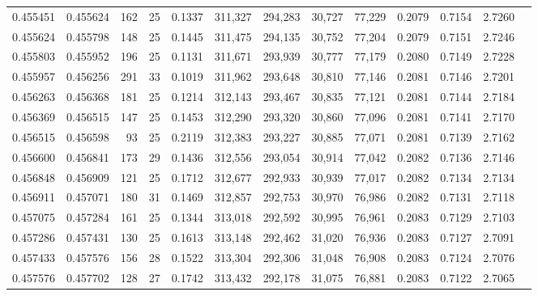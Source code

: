 \begin{tabular}{rrrrrrrrrrrrr}
0.455451 & 0.455624 &   162 &  25 &                                     0.1337 & 311,327 & 294,283 &  30,727 &  77,229 & 0.2079 & 0.7154 & 2.7260 \\
0.455624 & 0.455798 &   148 &  25 &                                     0.1445 & 311,475 & 294,135 &  30,752 &  77,204 & 0.2079 & 0.7151 & 2.7246 \\
0.455803 & 0.455952 &   196 &  25 &                                     0.1131 & 311,671 & 293,939 &  30,777 &  77,179 & 0.2080 & 0.7149 & 2.7228 \\
0.455957 & 0.456256 &   291 &  33 &                                     0.1019 & 311,962 & 293,648 &  30,810 &  77,146 & 0.2081 & 0.7146 & 2.7201 \\
0.456263 & 0.456368 &   181 &  25 &                                     0.1214 & 312,143 & 293,467 &  30,835 &  77,121 & 0.2081 & 0.7144 & 2.7184 \\
0.456369 & 0.456515 &   147 &  25 &                                     0.1453 & 312,290 & 293,320 &  30,860 &  77,096 & 0.2081 & 0.7141 & 2.7170 \\
0.456515 & 0.456598 &    93 &  25 &                                     0.2119 & 312,383 & 293,227 &  30,885 &  77,071 & 0.2081 & 0.7139 & 2.7162 \\
0.456600 & 0.456841 &   173 &  29 &                                     0.1436 & 312,556 & 293,054 &  30,914 &  77,042 & 0.2082 & 0.7136 & 2.7146 \\
0.456848 & 0.456909 &   121 &  25 &                                     0.1712 & 312,677 & 292,933 &  30,939 &  77,017 & 0.2082 & 0.7134 & 2.7134 \\
0.456911 & 0.457071 &   180 &  31 &                                     0.1469 & 312,857 & 292,753 &  30,970 &  76,986 & 0.2082 & 0.7131 & 2.7118 \\
0.457075 & 0.457284 &   161 &  25 &                                     0.1344 & 313,018 & 292,592 &  30,995 &  76,961 & 0.2083 & 0.7129 & 2.7103 \\
0.457286 & 0.457431 &   130 &  25 &                                     0.1613 & 313,148 & 292,462 &  31,020 &  76,936 & 0.2083 & 0.7127 & 2.7091 \\
0.457433 & 0.457576 &   156 &  28 &                                     0.1522 & 313,304 & 292,306 &  31,048 &  76,908 & 0.2083 & 0.7124 & 2.7076 \\
0.457576 & 0.457702 &   128 &  27 &                                     0.1742 & 313,432 & 292,178 &  31,075 &  76,881 & 0.2083 & 0.7122 & 2.7065 \\

\end{tabular}
